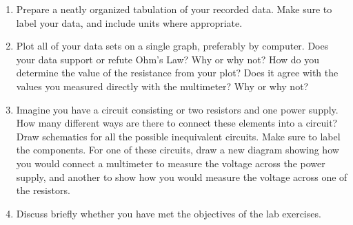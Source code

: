 \documentclass[12pt]{article}
\begin{document}
\begin{enumerate}
\item Prepare a neatly organized tabulation of your recorded data.
  Make sure to label your data, and include units where appropriate.  
\item Plot all of your data sets on a single graph, preferably by
  computer.  Does your data support or refute Ohm's Law?  Why or why
  not?  How do you determine the value of the resistance from your
  plot?  Does it agree with the values you measured directly with the
  multimeter?  Why or why not?
\item Imagine you have a circuit consisting or two resistors and one
  power supply.  How many different ways are there to connect these
  elements into a circuit?  Draw schematics for all the possible
  inequivalent circuits.  Make sure to label the components.  For one
  of these circuits, draw a new diagram showing how you would connect
  a multimeter to measure the voltage across the power supply, and
  another to show how you would measure the voltage across one of the
  resistors.
\item Discuss briefly whether you have met the objectives of the lab
  exercises.  
\end{enumerate}
\end{document}
